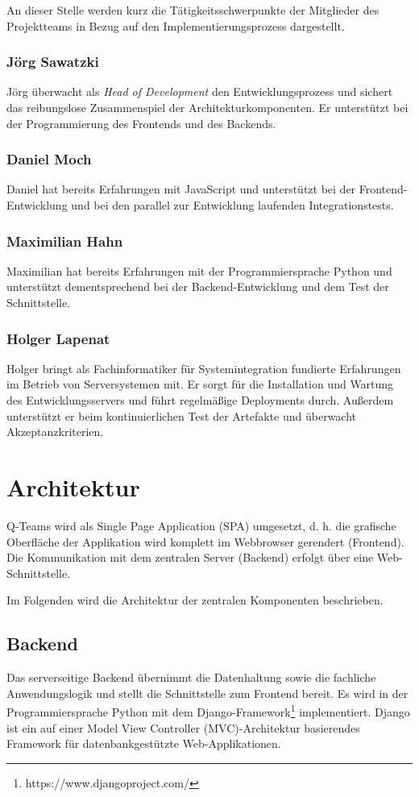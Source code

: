 \documentclass[a4paper,11pt,listof=numbered,glossary=totoc,parskip=half,toc=bib]{scrreprt}
\begin{document}
	An dieser Stelle werden kurz die Tätigkeitsschwerpunkte der Mitglieder des Projektteams in Bezug auf den Implementierungsprozess dargestellt.
	
	\subsubsection{Jörg Sawatzki}
	Jörg überwacht als \textit{Head of Development} den Entwicklungsprozess und sichert das reibungslose Zusammenspiel der Architekturkomponenten. Er unterstützt bei der Programmierung des Frontends und des Backends.
	
	\subsubsection{Daniel Moch}
	Daniel hat bereits Erfahrungen mit JavaScript und unterstützt bei der Frontend-Entwicklung und bei den parallel zur Entwicklung laufenden Integrationstests.
	
	\subsubsection{Maximilian Hahn}
	Maximilian hat bereits Erfahrungen mit der Programmiersprache Python und unterstützt dementsprechend bei der Backend-Entwicklung und dem Test der Schnittstelle.
	
	\subsubsection{Holger Lapenat}
	Holger bringt als Fachinformatiker für Systemintegration fundierte Erfahrungen im Betrieb von Serversystemen mit. Er sorgt für die Installation und Wartung des Entwicklungsservers und führt regelmäßige Deployments durch. Außerdem unterstützt er beim kontinuierlichen Test der Artefakte und überwacht Akzeptanzkriterien.

	
	\section{Architektur}
	\label{sec:architektur}
		Q-Teams wird als Single Page Application (SPA) umgesetzt, d. h. die grafische Oberfläche der Applikation wird komplett im Webbrowser gerendert (Frontend). Die Kommunikation mit dem zentralen Server (Backend) erfolgt über eine Web-Schnittstelle.
		
		Im Folgenden wird die Architektur der zentralen Komponenten beschrieben.
		
	\subsection{Backend}
	\label{subsec:backend}
	Das serverseitige Backend übernimmt die Datenhaltung sowie die fachliche Anwendungslogik und stellt die Schnittstelle zum Frontend bereit. Es wird in der Programmiersprache Python mit dem Django-Framework\footnote{https://www.djangoproject.com/} implementiert. Django ist ein auf einer \frqq{}Model View Controller (MVC)\flqq{}-Architektur basierendes Framework für datenbankgestützte Web-Applikationen.
	
\end{document}
